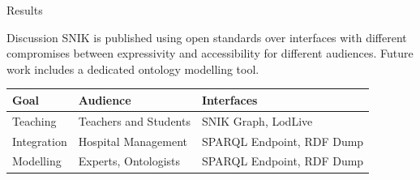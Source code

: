 \documentclass[portrait,final,a0paper,fontscale=0.310]{imiseposter}
\begin{document}
\begin{poster}
\begin{posterbox}[name=results,column=1]{Results}
\end{posterbox}
\begin{posterbox}[name=discussion,column=1,below=results]{Discussion}
SNIK is published using open standards over interfaces with different compromises between expressivity and accessibility for different audiences.
Future work includes a dedicated ontology modelling tool.
\begin{center}
\begin{tabulary}{\textwidth}{lll}
\toprule
\textbf{Goal}		&\textbf{Audience}		&\textbf{Interfaces}\\
\midrule
Teaching	&Teachers and Students		&SNIK Graph, LodLive\\
Integration	&Hospital Management		&SPARQL Endpoint, RDF Dump\\
Modelling	&Experts, Ontologists		&SPARQL Endpoint, RDF Dump\\
\bottomrule
\end{tabulary}
\end{center}

\begin{tabulary}{\columnwidth}{lL}
\toprule
\bottomrule
\end{tabulary}%


\end{posterbox}
\end{poster}
\end{document}
